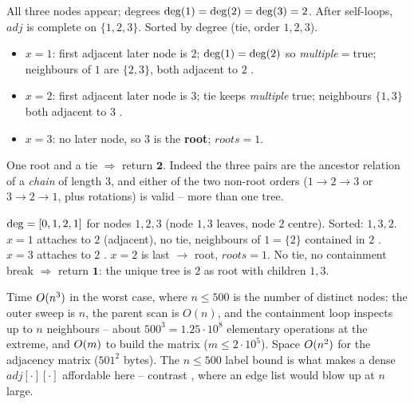 \begin{tracebox}
All three nodes appear; degrees $\operatorname{deg}(1)=\operatorname{deg}(2)=\operatorname{deg}(3)=2$. After self-loops,
$\mathit{adj}$ is complete on $\{1,2,3\}$. Sorted by degree (tie, order $1,2,3$).
\begin{itemize}[nosep,leftmargin=1.3em]
  \item $x=1$: first adjacent later node is $2$; $\operatorname{deg}(1)=\operatorname{deg}(2)$ so \emph{multiple}$=$true;
        neighbours of $1$ are $\{2,3\}$, both adjacent to $2$ \checkmark.
  \item $x=2$: first adjacent later node is $3$; tie keeps \emph{multiple} true; neighbours
        $\{1,3\}$ both adjacent to $3$ \checkmark.
  \item $x=3$: no later node, so $3$ is the \textbf{root}; $\mathit{roots}=1$.
\end{itemize}
One root and a tie $\Rightarrow$ return $\mathbf{2}$. Indeed the three pairs are the ancestor
relation of a \emph{chain} of length $3$, and either of the two non-root orders ($1\!\to\!2\!\to\!3$
or $3\!\to\!2\!\to\!1$, plus rotations) is valid -- more than one tree. \checkmark
\end{tracebox}
\begin{tracebox}
$\operatorname{deg}=[0,1,2,1]$ for nodes $1,2,3$ (node $1,3$ leaves, node $2$ centre). Sorted: $1,3,2$. $x=1$
attaches to $2$ (adjacent), no tie, neighbours of $1=\{2\}$ contained in $2$ \checkmark. $x=3$
attaches to $2$ \checkmark. $x=2$ is last $\to$ root, $\mathit{roots}=1$. No tie, no containment
break $\Rightarrow$ return $\mathbf{1}$: the unique tree is $2$ as root with children $1,3$.
\end{tracebox}

\begin{complexitybox}
Time $O(n^3)$ in the worst case, where $n\le500$ is the number of distinct nodes: the outer
sweep is $n$, the parent scan is $O(n)$, and the containment loop inspects up to $n$ neighbours --
about $500^3=1.25\cdot10^{8}$ elementary operations at the extreme, and $O(m)$ to build the
matrix ($m\le2\cdot10^{5}$). Space $O(n^2)$ for the adjacency matrix ($501^2$ bytes). The
$n\le500$ label bound is what makes a dense $\mathit{adj}[\cdot][\cdot]$ affordable here -- contrast
, where an edge list would blow up at $n$ large.
\end{complexitybox}

